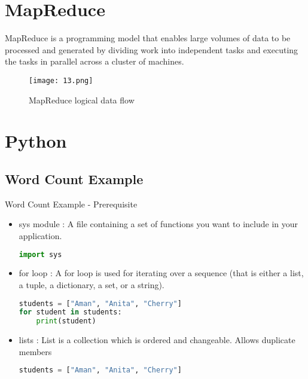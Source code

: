 \documentclass[pdf]{beamer}
\begin{document}
\section{MapReduce}
\begin{frame}[fragile]{}
MapReduce is a programming model that enables large volumes of data to be processed and generated by dividing work into independent tasks and executing the tasks in parallel across a cluster of machines.

\begin{figure}[ht]
	    \begin{center}
        		\texttt{[image: 13.png]}
    \end{center}
    \caption{MapReduce logical data flow\cite{hdg}}
    \end{figure}
\end{frame}



\section{Python}
\subsection{Word Count Example}
\begin{frame}[fragile]{Word Count Example - Prerequisite}
	\begin{itemize}
	\item sys module
	: A file containing a set of functions you want to include in your application.
\begin{lstlisting}[language=python]
import sys
\end{lstlisting}		
	\item for loop
	: A for loop is used for iterating over a sequence (that is either a list, a tuple, a dictionary, a set, or a string).
\begin{lstlisting}[language=python]
students = ["Aman", "Anita", "Cherry"] 
for student in students: 
	print(student)
\end{lstlisting}
	\item  lists : List is a collection which is ordered and changeable. Allows duplicate members
\begin{lstlisting}[language=python]
students = ["Aman", "Anita", "Cherry"] 	
\end{lstlisting}	
	\end{itemize}
\end{frame}
\end{document}
